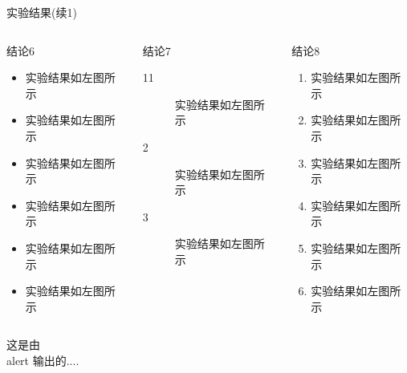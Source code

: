 \documentclass[8pt,compress,t,notheorems,noamsthm,notheorem,xcolor=x11names]{beamer}
\theoremstyle{nonumberplain}%
\theoremstyle{plain}
\begin{document}
\begin{frame}{实验结果(续1)}
\begin{columns}[T,onlytextwidth]
	
	\begin{column}{0.30\textwidth}
		\begin{block}{结论6}
			\begin{itemize}
				\item 实验结果如左图所示
				\item 实验结果如左图所示
				\item 实验结果如左图所示
				\item 实验结果如左图所示
				\item 实验结果如左图所示
				\item 实验结果如左图所示
			\end{itemize}
		\end{block}
	\end{column}
	
	\begin{column}{0.30\textwidth}
		\begin{block}{结论7}
			\begin{description}
				\item[11] 实验结果如左图所示
				\item[2] 实验结果如左图所示
				\item[3] 实验结果如左图所示
				
			\end{description}
		\end{block}
	\end{column}
	
	\begin{column}{0.30\textwidth}
		\begin{block}{结论8}
			\begin{enumerate}
				\item 实验结果如左图所示
				\item 实验结果如左图所示
				\item 实验结果如左图所示
				\item 实验结果如左图所示
				\item 实验结果如左图所示
				\item 实验结果如左图所示
			\end{enumerate}
		\end{block}
	\end{column}
\end{columns}

\alert{这是由 \\ alert 输出的....}

\end{frame}
\end{document}
